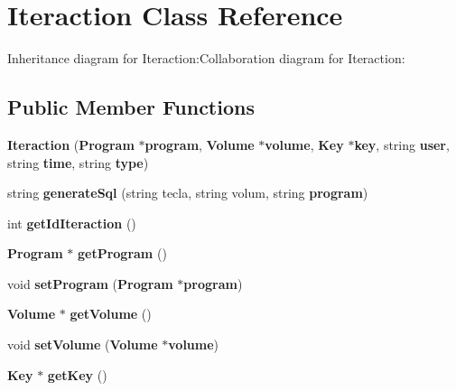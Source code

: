 \section{Iteraction Class Reference}
\label{classbr_1_1ufscar_1_1lince_1_1ginga_1_1recommender_1_1Iteraction}
Inheritance diagram for Iteraction:Collaboration diagram for Iteraction:\subsection*{Public Member Functions}
\begin{CompactItemize}
\item 
\textbf{Iteraction} ({\bf Program} $\ast${\bf program}, {\bf Volume} $\ast${\bf volume}, {\bf Key} $\ast${\bf key}, string {\bf user}, string {\bf time}, string {\bf type})\label{classbr_1_1ufscar_1_1lince_1_1ginga_1_1recommender_1_1Iteraction_ad8f865da222e8e385310eb156bd87c4}

\item 
string \textbf{generateSql} (string tecla, string volum, string {\bf program})\label{classbr_1_1ufscar_1_1lince_1_1ginga_1_1recommender_1_1Iteraction_fac6826fb389402d5e1b068943d25f12}

\item 
int \textbf{getIdIteraction} ()\label{classbr_1_1ufscar_1_1lince_1_1ginga_1_1recommender_1_1Iteraction_cdf7026b3010b28cc0d38d47e228fa4e}

\item 
{\bf Program} $\ast$ \textbf{getProgram} ()\label{classbr_1_1ufscar_1_1lince_1_1ginga_1_1recommender_1_1Iteraction_ac039640546a9d50c3c501ddfd52d4b1}

\item 
void \textbf{setProgram} ({\bf Program} $\ast${\bf program})\label{classbr_1_1ufscar_1_1lince_1_1ginga_1_1recommender_1_1Iteraction_c6b5dabe8a4be0d8d4fda3c713347609}

\item 
{\bf Volume} $\ast$ \textbf{getVolume} ()\label{classbr_1_1ufscar_1_1lince_1_1ginga_1_1recommender_1_1Iteraction_251f14faa29f26f72fc5b4600f7cf044}

\item 
void \textbf{setVolume} ({\bf Volume} $\ast${\bf volume})\label{classbr_1_1ufscar_1_1lince_1_1ginga_1_1recommender_1_1Iteraction_b2c125c2a699d48a62a33b96d6218fe4}

\item 
{\bf Key} $\ast$ \textbf{getKey} ()\label{classbr_1_1ufscar_1_1lince_1_1ginga_1_1recommender_1_1Iteraction_772bc47b1485f4601626b3d5b9d63500}


\end{CompactItemize}
